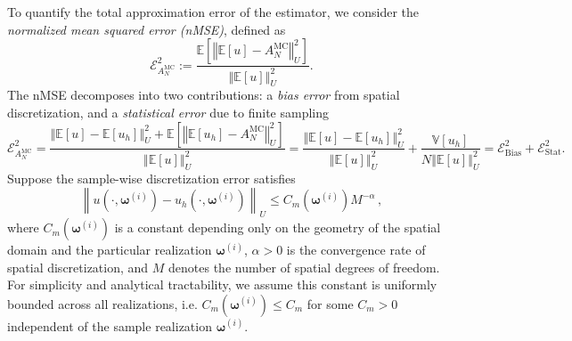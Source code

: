 To quantify the total approximation error of the estimator, we consider the  {\it normalized mean squared error (nMSE)}, defined as
%
 \[
\mathcal{E}_{A^{\text{MC}}_{N}}^2:=\frac{\mathbb E\left[\left\Vert\mathbb{E}[u]-A^{\text{MC}}_{N} \right\Vert_{U}^2\right]}{\left\Vert\mathbb{E}[u] \right\Vert_{U}^2}.
\] 
%
The nMSE decomposes into two contributions: a {\it bias error} from spatial discretization, and a {\it statistical error} due to finite sampling
%
\[
\mathcal{E}_{A^{\text{MC}}_{N}}^2 = \frac{\left\Vert\mathbb{E}[u]-\mathbb{E}[u_{h}] \right\Vert_{U}^2+\mathbb E\left[\left\Vert \mathbb{E}[u_{h}] -A^{\text{MC}}_{N} \right\Vert_{U}^2\right]}{\left\Vert\mathbb{E}[u] \right\Vert_{U}^2} = \frac{\left\Vert\mathbb{E}[u]-\mathbb{E}[u_{h}] \right\Vert_{U}^2}{\left\Vert\mathbb{E}[u] \right\Vert_{U}^2}+\frac{\mathbb{V}\left[u_{h}\right]}{N\left\Vert\mathbb{E}[u] \right\Vert_{U}^2}=\mathcal{E}_{\text{Bias}}^2 + \mathcal{E}_{\text{Stat}}^2.
\]
%
Suppose the sample-wise discretization error satisfies
%
\begin{equation*} \label{eq:Assumption_uhA}
\left\|u\left(\cdot, \boldsymbol\omega^{(i)}\right)-u_h\left(\cdot,\boldsymbol\omega^{(i)}\right)\right\|_U\leq C_m\left(\boldsymbol\omega^{(i)}\right)M^{-\alpha}\,,
\end{equation*}
%
where $C_m(\boldsymbol\omega^{(i)})$ is a constant depending only on the geometry of the spatial domain and the particular realization $\boldsymbol\omega^{(i)}$, $\alpha>0$ is the convergence rate of spatial discretization, and $M$ denotes the number of spatial degrees of freedom. For simplicity and analytical tractability, we assume this constant is uniformly bounded across all realizations, i.e. $C_m(\boldsymbol\omega^{(i)})\le C_m$ for some $C_m>0$ independent of the sample realization $\boldsymbol\omega^{(i)}$.


